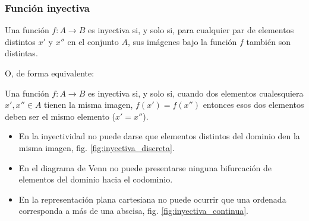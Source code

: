 \subsubsection{Función inyectiva}
\vspace{1em} 
\begin{fmd-definition}
	Una función $f: A \rightarrow B$ es inyectiva si, y solo si, para cualquier par de elementos distintos $x'$ y $x''$ en el conjunto $A$, sus imágenes bajo la función $f$ también son distintas.
\end{fmd-definition}
\vspace{1mm}

O, de forma equivalente:

Una función $f: A \rightarrow B$ es inyectiva si, y solo si, cuando dos elementos cualesquiera $x', x'' \in A$ tienen la misma imagen, $f(x') = f(x'')$ entonces esos dos elementos deben ser el mismo elemento ($x' = x''$).

\begin{itemize}
	\item En la inyectividad no puede darse que elementos distintos del dominio den la misma
	imagen, fig. \ref{fig:inyectiva_discreta}.
	\item En el diagrama de Venn no puede presentarse ninguna bifurcación de elementos del 
	dominio hacia el codominio.
	\item En la representación plana cartesiana no puede ocurrir que una ordenada
	corresponda a más de una abscisa, fig. \ref{fig:inyectiva_continua}.
\end{itemize}

